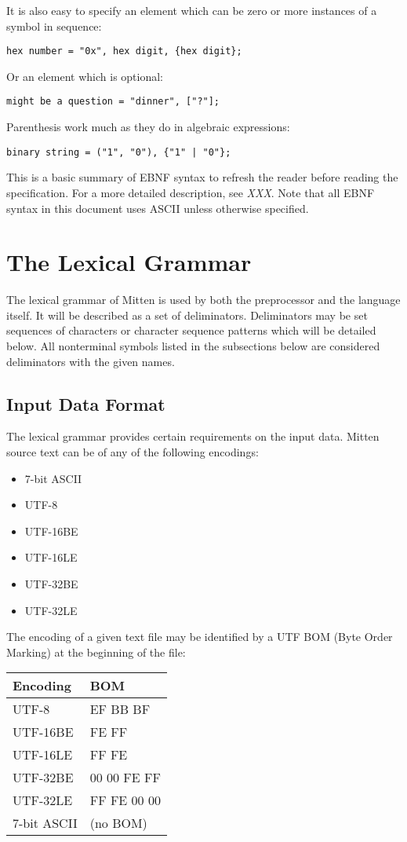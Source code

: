 \documentclass[10pt,a4paper]{article}
\begin{document}
It is also easy to specify an element which can be zero or more instances of a symbol in sequence:
\begin{verbatim}
hex number = "0x", hex digit, {hex digit};
\end{verbatim}

Or an element which is optional:
\begin{verbatim}
might be a question = "dinner", ["?"];
\end{verbatim}

Parenthesis work much as they do in algebraic expressions:
\begin{verbatim}
binary string = ("1", "0"), {"1" | "0"};
\end{verbatim}

This is a basic summary of EBNF syntax to refresh the reader before reading the specification. For a more detailed description, see \textit{XXX}. Note that all EBNF syntax in this document uses ASCII unless otherwise specified.

\section{The Lexical Grammar}
The lexical grammar of Mitten is used by both the preprocessor and the language itself. It will be described as a set of deliminators. Deliminators may be set sequences of characters or character sequence patterns which will be detailed below. All nonterminal symbols listed in the subsections below are considered deliminators with the given names.

\subsection{Input Data Format}
The lexical grammar provides certain requirements on the input data. Mitten source text can be of any of the following encodings:
\begin{itemize}
\item 7-bit ASCII
\item UTF-8
\item UTF-16BE
\item UTF-16LE
\item UTF-32BE
\item UTF-32LE
\end{itemize}

The encoding of a given text file may be identified by a UTF BOM (Byte Order Marking) at the beginning of the file:\newline
\begin{tabular}{|l|l|}
\hline
\textbf{Encoding} & \textbf{BOM} \\
\hline
UTF-8 & EF BB BF \\
\hline
UTF-16BE & FE FF \\
\hline
UTF-16LE & FF FE \\
\hline
UTF-32BE & 00 00 FE FF \\
\hline
UTF-32LE & FF FE 00 00 \\
\hline
7-bit ASCII & (no BOM) \\
\hline
\end{tabular}
\end{document}
